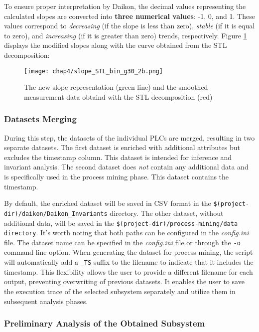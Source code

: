 \bigskip
To ensure proper interpretation by Daikon, the decimal values representing the calculated slopes are converted into \textbf{three numerical values}: -1, 0, and 1. These values correspond to \textit{decreasing} (if the slope is less than zero), \textit{stable} (if it is equal to zero), and \textit{increasing} (if it is greater than zero) trends, respectively. Figure \ref{fig:4_slope_daikon} displays the modified slopes along with the curve obtained from the STL decomposition:

\begin{figure}[ht]
	\centering
	\texttt{[image: chap4/slope\_STL\_bin\_g30\_2b.png]}
	\caption{The new slope representation (green line) and the smoothed measurement data obtaind with the STL decomposition (red)}
	\label{fig:4_slope_daikon}
\end{figure}

\subsubsection{Datasets Merging}
\label{subsubsec:4_dataset_merging}
During this step, the datasets of the individual PLCs are merged, resulting in two separate datasets. The first dataset is enriched with additional attributes but excludes the timestamp column. This dataset is intended for inference and invariant analysis. The second dataset does \textit{not} contain any additional data and is specifically used in the process mining phase. This dataset contains the timestamp.

\bigskip
By default, the enriched dataset will be saved in CSV format in the \texttt{\$(project-dir)/daikon/Daikon\_Invariants} directory. The other dataset, without additional data, will be saved in the \texttt{\$(project-dir)/process-mining/data directory}. It's worth noting that both paths can be configured in the \textit{config.ini} file. The dataset name can be specified in the \textit{config.ini} file or through the \texttt{-o} command-line option. When generating the dataset for process mining, the script will automatically add a \texttt{\_TS} suffix to the filename to indicate that it includes the timestamp. This flexibility allows the user to provide a different filename for each output, preventing overwriting of previous datasets. It enables the user to save the execution trace of the selected subsystem separately and utilize them in subsequent analysis phases.

\vfill

\subsubsection{Preliminary Analysis of the Obtained Subsystem}
\label{subsubsec:4_brief_analysis}

